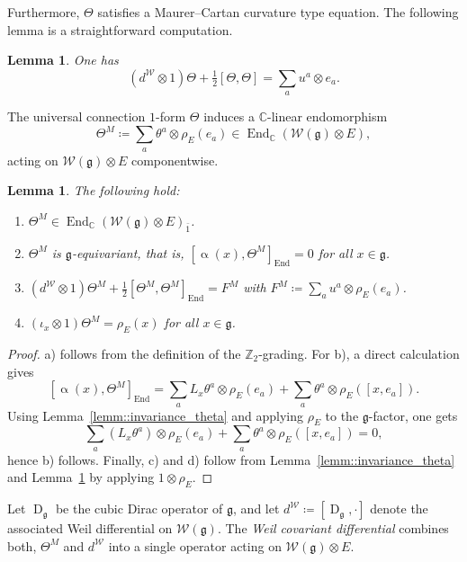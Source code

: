 \documentclass[11pt]{amsart}
\newcommand{\End}{\operatorname{End}}
\newcommand{\Dirac}{\operatorname{D}}
\def\CC{{\mathbb C}}
\def\gg{{\mathfrak{g}}}
\theoremstyle{plain}
\newtheorem{lemma}[theorem]{Lemma}
\theoremstyle{remark}
\theoremstyle{definition}
\numberwithin{equation}{section}
\theoremstyle{remark}
\begin{document}
Furthermore, $\Theta$ satisfies a Maurer--Cartan curvature type equation. The following lemma is a straightforward computation.

\begin{lemma} \label{lemm::MCE}
 One has 
 \[
 (d^{\mathcal{W}}\otimes 1)\Theta + \tfrac{1}{2}[\Theta,\Theta]=\sum_{a}u^{a}\otimes e_{a}.\]
\end{lemma}

The universal connection $1$-form $\Theta$ induces a $\mathbb{C}$-linear endomorphism
\begin{equation}
 \Theta^{M}\coloneqq \sum_{a}\theta^{a} \otimes \rho_{E}(e_{a}) \in \End_{\mathbb{C}}(\mathcal{W}(\gg) \otimes E),
\end{equation}
acting on $\mathcal{W}(\gg)\otimes E$ componentwise. 

\begin{lemma} \label{lemm::properties_Theta_M}
 The following hold:
 \begin{enumerate}
 \item[a)] $\Theta^{M} \in \End_{\CC}(\mathcal{W}(\gg) \otimes E)_{\bar{1}}$.
 \item[b)] $\Theta^{M}$ is $\gg$-equivariant, that is, $
 [\upalpha(x),\Theta^{M}]_{\End}=0
 $ for all $x \in \gg$.
 \item[c)] $(d^{\mathcal{W}}\otimes 1)\Theta^{M} + \tfrac{1}{2}[\Theta^{M},\Theta^{M}]_{\End}=F^{M}$ with $F^{M}\coloneqq \sum_{a} u^{a} \otimes \rho_{E}(e_{a})$.
 \item[d)] $(\iota_{x}\otimes 1)\Theta^{M}=\rho_{E}(x)$ for all $x \in \gg$.
 \end{enumerate}
\end{lemma}

\begin{proof}
 a) follows from the definition of the $\mathbb{Z}_{2}$-grading. For b), a direct calculation gives
 \[
 [\upalpha(x),\Theta^{M}]_{\End}=\sum_{a}L_{x}\theta^{a}\otimes \rho_{E}(e_{a})+\sum_{a}\theta^{a}\otimes \rho_{E}([x,e_{a}]).
 \]
 Using Lemma~\ref{lemm::invariance_theta} and applying $\rho_{E}$ to the $\gg$-factor, one gets
 \[
 \sum_{a}(L_{x}\theta^{a})\otimes \rho_{E}(e_{a})+\sum_{a}\theta^{a}\otimes \rho_{E}([x,e_{a}])=0,
 \]
 hence b) follows.
 Finally, c) and d) follow from Lemma~\ref{lemm::invariance_theta} and Lemma~\ref{lemm::MCE} by applying $1\otimes \rho_{E}$.
\end{proof}

Let $\Dirac_{\gg}$ be the cubic Dirac operator of $\gg$, and let $d^{\mathcal{W}}\coloneqq [\Dirac_{\gg},\cdot]$ denote the associated Weil differential on $\mathcal{W}(\gg)$. The \emph{Weil covariant differential} combines both, $\Theta^{M}$ and $d^{\mathcal{W}}$ into a single operator acting on $\mathcal{W}(\gg)\otimes E$.
\end{document}
